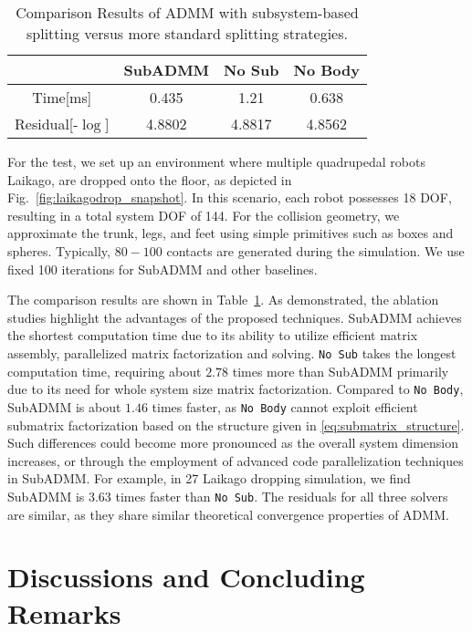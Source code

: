 \documentclass[lettersize,journal]{IEEEtran}
\begin{document}
\begin{table}[t]
\centering
\caption{Comparison Results of ADMM with subsystem-based splitting versus more standard splitting strategies.}
\renewcommand{\arraystretch}{1.5}{
\begin{tabular}{|c|c|c|c|}
\hline
& SubADMM & No Sub & No Body  \\
\hline
Time[ms] & 0.435 & 1.21 & 0.638  \\
\hline 
Residual[-$\log$] &  4.8802  &  4.8817 & 4.8562  \\
\hline 
\end{tabular}
}
\label{table:ablation_subadmm}
\end{table}




For the test, we set up an environment where multiple quadrupedal robots Laikago, are dropped onto the floor, as depicted in Fig.~\ref{fig:laikagodrop_snapshot}.
In this scenario, each robot possesses 18 DOF, resulting in a total system DOF of 144. For the collision geometry, we approximate the trunk, legs, and feet using simple primitives such as boxes and spheres. Typically, $80-100$ contacts are generated during the simulation.  
We use fixed 100 iterations for SubADMM and other baselines.

The comparison results are shown in Table~\ref{table:ablation_subadmm}. 
As demonstrated, the ablation studies highlight the advantages of the proposed techniques. 
SubADMM achieves the shortest computation time due to its ability to utilize efficient matrix assembly, parallelized matrix factorization and solving.
\texttt{No Sub} takes the longest computation time, requiring about $2.78$ times more than SubADMM primarily due to its need for whole system size matrix factorization. 
Compared to \texttt{No Body}, SubADMM is about $1.46$ times faster, as \texttt{No Body} cannot exploit efficient submatrix factorization based on the structure given in \eqref{eq:submatrix_structure}. 
Such differences could become more pronounced as the overall system dimension increases, or through the employment of advanced code parallelization techniques in SubADMM.
For example, in 27 Laikago dropping simulation, we find SubADMM is $3.63$ times faster than \texttt{No Sub}.
The residuals for all three solvers are similar, as they share similar theoretical convergence properties of ADMM. 


\section{Discussions and Concluding Remarks} 
\label{sec:discussremark}
\end{document}
